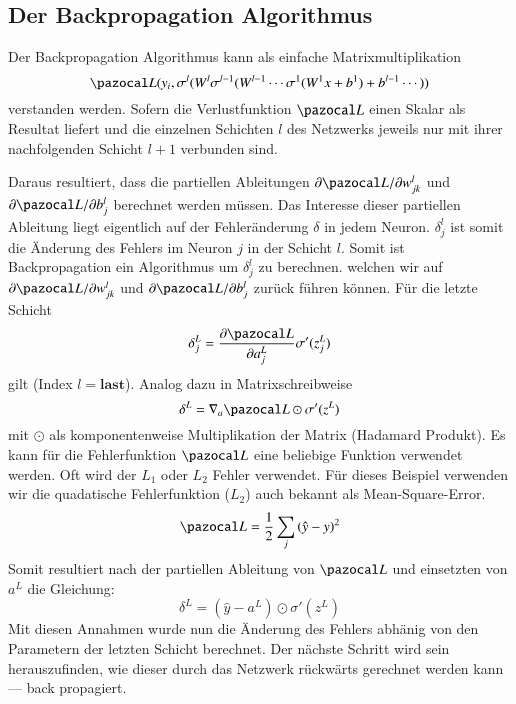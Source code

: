 \subsection{Der Backpropagation Algorithmus}
Der Backpropagation Algorithmus kann als einfache Matrixmultiplikation
\begin{equation}
\Lb(y_{i}, \sigma^{l}(W^{l}\sigma^{l-1}(W^{l-1}\cdots \sigma^{1}(W^{1}x+b^{1}) + b^{l-1} \cdots ) )
\end{equation}
verstanden werden. Sofern die Verlustfunktion $\Lb$ einen Skalar als Resultat liefert und die einzelnen Schichten $l$ des Netzwerks jeweils nur mit ihrer nachfolgenden Schicht $l+1$ verbunden sind.

Daraus resultiert, dass die partiellen Ableitungen  $\partial \Lb / \partial w^l_{jk}$ und $\partial \Lb / \partial b^l_j$ berechnet werden müssen. Das Interesse dieser partiellen Ableitung liegt eigentlich auf der Fehleränderung $\delta$ in jedem Neuron. $\delta^{l}_{j}$ ist somit die Änderung des Fehlers im Neuron $j$ in der Schicht $l$. Somit ist Backpropagation ein Algorithmus um $\delta^{l}_{j}$ zu berechnen.  welchen wir auf $\partial \Lb / \partial w^l_{jk}$ und $\partial \Lb / \partial b^l_j$ zurück führen können. Für die letzte Schicht
\begin{equation}
\delta^{L}_{j} = \frac{\partial \Lb}{\partial a^{L}_{j}} \sigma'(z^L_j)
\end{equation}
gilt (Index $l=\textbf{last}$). Analog dazu in Matrixschreibweise
\begin{equation}
\delta^{L} = \nabla_a \Lb \odot \sigma'(z^L)
\end{equation}
mit $\odot$ als komponentenweise Multiplikation der Matrix (Hadamard Produkt). Es kann für die Fehlerfunktion $\Lb$ eine beliebige Funktion verwendet werden. Oft wird der $L_1$ oder $L_2$ Fehler verwendet. Für dieses Beispiel verwenden wir die quadatische Fehlerfunktion ($L_2$) auch bekannt als Mean-Square-Error.
\begin{equation}
\Lb = \frac{1}{2} \sum_j \left( \hat{y} - y \right)^2
\end{equation}
Somit resultiert nach der partiellen Ableitung von $\Lb$ und einsetzten von $a^L$ die Gleichung:
\begin{equation}
\delta^{L} = (\hat{y} - a^L) \odot \sigma'(z^L)
\end{equation}
Mit diesen Annahmen wurde nun die Änderung des Fehlers abhänig von den Parametern der letzten Schicht berechnet. Der nächste Schritt wird sein herauszufinden, wie dieser durch das Netzwerk rückwärts gerechnet werden kann --- back propagiert.
